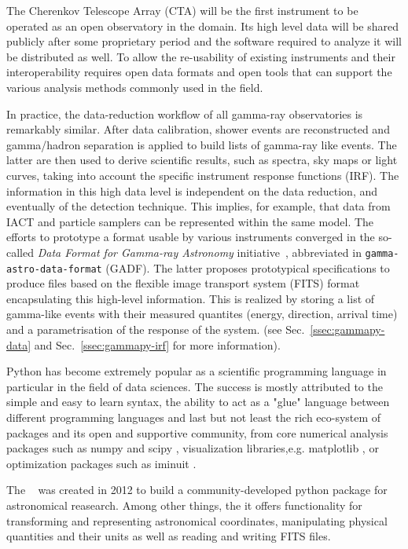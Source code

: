 The Cherenkov Telescope Array (CTA) will be the first instrument to be operated
as an open observatory in the domain. Its high level data will be shared publicly after
some proprietary period and the software required to analyze it will be distributed
as well. To allow the re-usability of existing instruments and their interoperability
requires open data formats and open tools that can support the various analysis methods
commonly used in the field.


In practice, the data-reduction workflow of all gamma-ray observatories
is remarkably similar.
After data calibration, shower events are reconstructed and
gamma/hadron separation is applied to build lists of gamma-ray like events.
The latter are then used to derive scientific results, such as spectra, sky maps
or light curves, taking into account the specific instrument response functions (IRF).
The information in this high data level is independent on
the data reduction, and eventually of the detection technique. This implies,
for example, that data from IACT and particle samplers can be represented
within the same model. The efforts to prototype a format usable by various instruments
converged in the so-called \textit{Data Format for Gamma-ray Astronomy}
initiative~\citep{gadf_proc, gadf_universe}, abbreviated in
\texttt{gamma-astro-data-format} (GADF). The latter proposes prototypical
specifications to produce files based on the flexible image transport system
(FITS) format~\citep{fits} encapsulating this high-level information. This is
realized by storing a list of gamma-like events with their measured quantites
(energy, direction, arrival time) and a parametrisation of the response of the
system. (see Sec.~\ref{ssec:gammapy-data} and Sec.~\ref{ssec:gammapy-irf} for
more information).

Python has become extremely popular as a scientific programming language
in particular in the field of data sciences. The success is
mostly attributed to the simple and easy to learn syntax, the ability to act as
a "glue" language between different programming languages and last but not least
the rich eco-system of packages and its open and supportive community, from
core numerical analysis packages such as numpy \citep{numpy} and
scipy \citep{2020SciPy-NMeth}, visualization libraries,e.g. matplotlib \citep{matplotlib},
or optimization packages such as iminuit \citep{iminuit}.

The \astropy~\citep{astropy} was created in 2012 to build a community-developed
python package for astronomical reasearch. Among other things, the it offers functionality for
transforming and representing astronomical coordinates, manipulating physical quantities
and their units as well as reading and writing FITS files.

